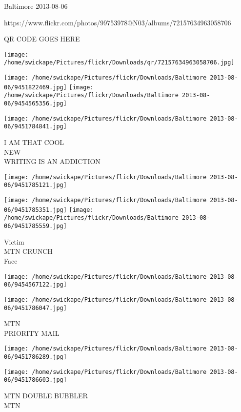 \documentclass[10pt,letterpaper]{article}
\begin{document}
Baltimore 2013-08-06

https://www.flickr.com/photos/99753978@N03/albums/72157634963058706

QR CODE GOES HERE

\texttt{[image: /home/swickape/Pictures/flickr/Downloads/qr/72157634963058706.jpg]}
\pagebreak

\texttt{[image: /home/swickape/Pictures/flickr/Downloads/Baltimore 2013-08-06/9451822469.jpg]}
\texttt{[image: /home/swickape/Pictures/flickr/Downloads/Baltimore 2013-08-06/9454565356.jpg]}

\texttt{[image: /home/swickape/Pictures/flickr/Downloads/Baltimore 2013-08-06/9451784841.jpg]}

I AM THAT COOL\\
NEW\\
WRITING IS AN ADDICTION\\
\pagebreak

\texttt{[image: /home/swickape/Pictures/flickr/Downloads/Baltimore 2013-08-06/9451785121.jpg]}

\vspace{0.25in}
\texttt{[image: /home/swickape/Pictures/flickr/Downloads/Baltimore 2013-08-06/9451785351.jpg]}
\texttt{[image: /home/swickape/Pictures/flickr/Downloads/Baltimore 2013-08-06/9451785559.jpg]}

Victim\\
MTN CRUNCH\\
Face\\
\pagebreak

\texttt{[image: /home/swickape/Pictures/flickr/Downloads/Baltimore 2013-08-06/9454567122.jpg]}

\vspace{0.25in}
\texttt{[image: /home/swickape/Pictures/flickr/Downloads/Baltimore 2013-08-06/9451786047.jpg]}

MTN\\
PRIORITY MAIL\\
\pagebreak

\texttt{[image: /home/swickape/Pictures/flickr/Downloads/Baltimore 2013-08-06/9451786289.jpg]}

\vspace{0.25in}
\texttt{[image: /home/swickape/Pictures/flickr/Downloads/Baltimore 2013-08-06/9451786603.jpg]}

MTN DOUBLE BUBBLER\\
MTN\\
\pagebreak
\end{document}
